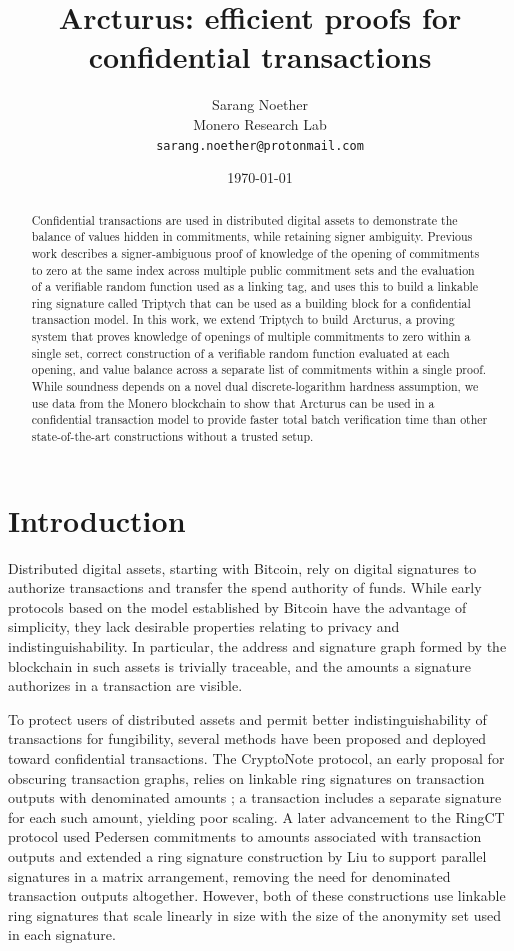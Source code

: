 \documentclass{article}
\title{Arcturus: efficient proofs for confidential transactions}
\author{Sarang Noether \\ Monero Research Lab \\ \texttt{sarang.noether@protonmail.com}}
\date{\today}
\theoremstyle{definition}
\begin{document}
\maketitle


\begin{abstract}
Confidential transactions are used in distributed digital assets to demonstrate the balance of values hidden in commitments, while retaining signer ambiguity.
Previous work describes a signer-ambiguous proof of knowledge of the opening of commitments to zero at the same index across multiple public commitment sets and the evaluation of a verifiable random function used as a linking tag, and uses this to build a linkable ring signature called Triptych that can be used as a building block for a confidential transaction model.
In this work, we extend Triptych to build Arcturus, a proving system that proves knowledge of openings of multiple commitments to zero within a single set, correct construction of a verifiable random function evaluated at each opening, and value balance across a separate list of commitments within a single proof.
While soundness depends on a novel dual discrete-logarithm hardness assumption, we use data from the Monero blockchain to show that Arcturus can be used in a confidential transaction model to provide faster total batch verification time than other state-of-the-art constructions without a trusted setup.
\end{abstract}


\section{Introduction}
Distributed digital assets, starting with Bitcoin, rely on digital signatures to authorize transactions and transfer the spend authority of funds.
While early protocols based on the model established by Bitcoin have the advantage of simplicity, they lack desirable properties relating to privacy and indistinguishability.
In particular, the address and signature graph formed by the blockchain in such assets is trivially traceable, and the amounts a signature authorizes in a transaction are visible.

To protect users of distributed assets and permit better indistinguishability of transactions for fungibility, several methods have been proposed and deployed toward confidential transactions.
The CryptoNote protocol, an early proposal for obscuring transaction graphs, relies on linkable ring signatures on transaction outputs with denominated amounts \cite{cryptonote}; a transaction includes a separate signature for each such amount, yielding poor scaling.
A later advancement to the RingCT protocol \cite{ringct} used Pedersen commitments to amounts associated with transaction outputs and extended a ring signature construction by Liu  \cite{liu} to support parallel signatures in a matrix arrangement, removing the need for denominated transaction outputs altogether.
However, both of these constructions use linkable ring signatures that scale linearly in size with the size of the anonymity set used in each signature.
\end{document}
